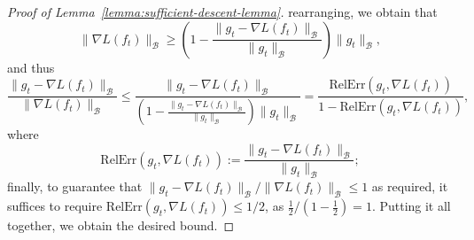 \documentclass{article}
\newcommand{\B}{\mathcal{B}}
\newcommand{\RelErr}{\mathrm{RelErr}}
\begin{document}
\begin{proof}[Proof of Lemma~\ref{lemma:sufficient-descent-lemma}]
    rearranging, we obtain that
    \[ \lVert \nabla L(f_t) \rVert_\B \geq \left( 1 - \frac{\lVert g_t - \nabla L(f_t) \rVert_\B}{\lVert g_t \rVert_\B} \right) \lVert g_t \rVert_\B, \]
    and thus
    \[ \frac{\lVert g_t - \nabla L(f_t) \rVert_\B}{\lVert \nabla L(f_t) \rVert_\B} \leq \frac{\lVert g_t - \nabla L(f_t) \rVert_\B}{\left( 1 - \frac{\lVert g_t - \nabla L(f_t) \rVert_\B}{\lVert g_t \rVert_\B} \right) \lVert g_t \rVert_\B} = \frac{\RelErr(g_t, \nabla L(f_t))}{1 - \RelErr(g_t, \nabla L(f_t))}, \]
    where
    \[ \RelErr(g_t, \nabla L(f_t)) := \frac{\lVert g_t - \nabla L(f_t) \rVert_\B}{\lVert g_t \rVert_\B}; \]
    finally, to guarantee that ${\lVert g_t - \nabla L(f_t) \rVert_\B}/{\lVert \nabla L(f_t) \rVert_\B} \leq 1$ as required, it suffices to require $\RelErr(g_t, \nabla L(f_t)) \leq 1/2$, as $\frac{1}{2} / (1 - \frac{1}{2}) = 1$.
    Putting it all together, we obtain the desired bound.
\end{proof}
\end{document}
